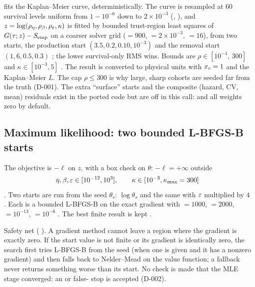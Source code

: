   fits the Kaplan--Meier curve, deterministically.
The curve is resampled at $60$ survival levels uniform from $1-10^{-6}$ down to $2\times10^{-3}$
(, ), and $z=\log(\rho_\eta,\rho_\beta,\rho_\varepsilon,\kappa)$ is fitted by
bounded trust-region least squares of $G(\tau;z)-S_{\rm emp}$ on a coarser solver grid
($=900$, $=2\times10^{-3}$, $=16$), from two starts, the production start
$(3.5,0.2,0.10,10^{-3})$ and the removal start $(1,6,0.5,0.3)$ ; the
lower survival-only RMS wins. Bounds are $\rho\in[10^{-4},\,300]$ and $\kappa\in[10^{-3},5]$
. The result is converted to physical units with $x_c=1$ and the
Kaplan--Meier $L$. The cap $\rho\le300$ is why large, sharp cohorts are seeded far from the truth (D-001).
The extra ``surface'' starts and the composite (hazard, CV, mean) residuals exist in the ported code but are off
in this call:  and all weights zero by default.

\subsection{Maximum likelihood: two bounded L-BFGS-B starts}\label{sec:pv-mle}

The objective is $-\ell$ on $z$, with a box check on $\theta$: $-\ell=+\infty$ outside
\begin{equation}
  \eta,\beta,\varepsilon\in[10^{-12},10^3],\qquad\kappa\in[10^{-3},\kappa_{\max}=300]
\end{equation}
. Two starts are run from the seed
$\theta_s$: $\log\theta_s$ and the same with $\varepsilon$ multiplied by $4$ .
Each is a bounded L-BFGS-B on the exact gradient with $=1000$, $=2000$,
$=10^{-13}$, $=10^{-6}$ . The best finite result is kept
.

Safety net ( ). A gradient method cannot leave a region where the
gradient is exactly zero. If the start value is not finite or its gradient is identically zero, the search
first tries L-BFGS-B from the seed (when one is given and it has a nonzero gradient) and then falls back to
Nelder--Mead on the value function; a fallback never returns something worse than its start. No check is made
that the MLE stage converged: an  or false- stop is accepted (D-002).

